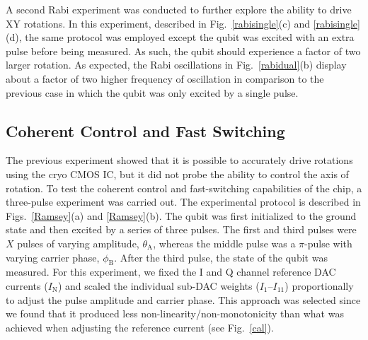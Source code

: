 \documentclass[journal]{IEEEtran}
\newcommand{\CR}[1]{{\color{black}#1}}
\begin{document}
A second Rabi experiment was conducted to further explore the ability to drive XY rotations. In this experiment, described in \CR{Fig.~\ref{rabisingle}(c) and \ref{rabisingle}(d)}, the same protocol was employed except the qubit was excited with an extra pulse before being measured. As such, the qubit should experience a factor of two larger rotation. As expected, the Rabi oscillations in Fig.~\ref{rabidual}\CR{(b)} display about a factor of two higher frequency of oscillation in comparison to the previous case in which the qubit was only excited by a single pulse. 


\subsection{Coherent Control and Fast Switching}
The previous experiment showed that it is possible to accurately drive rotations using the cryo CMOS IC, but it did not probe the ability to control the axis of rotation. To test the coherent control and fast-switching capabilities of the chip, a three-pulse experiment was carried out. The experimental protocol is described in Figs.~\ref{Ramsey}(a) and \ref{Ramsey}(b). The qubit was first initialized to the ground state and then excited by a series of three pulses. The first and third pulses were $X$ pulses of varying amplitude, $\theta_\text{A}$, whereas the middle pulse was a $\pi$-pulse with varying carrier phase, $\phi_\text{B}$. After the third pulse, the state of the qubit was measured. \CR{For this experiment, we fixed the I and Q channel reference DAC currents ($I_\text{N}$) and scaled the individual sub-DAC weights ($I_\text{1}$--$I_\text{11}$) proportionally to adjust the pulse amplitude and carrier phase. This approach was selected since we found that it produced less non-linearity/non-monotonicity than what was achieved when adjusting the reference current (see Fig.~\ref{cal}).} 
\end{document}
